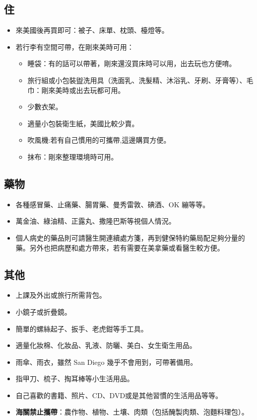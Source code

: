 \documentclass[10pt,a4paper]{book}
\begin{document}
\begin{CJK}{UTF8}{bkai}
\subsection{住}
\begin{itemize}
\item 來美國後再買即可：被子、床單、枕頭、檯燈等。
\item 若行李有空間可帶，在剛來美時可用：
\begin{itemize}
\item 睡袋：有的話可以帶著，剛來還沒買床時可以用，出去玩也方便唷。
\item 旅行組或小包裝盥洗用具（洗面乳、洗髮精、沐浴乳、牙刷、牙膏等）、毛巾：剛來美時或出去玩都可用。
\item 少數衣架。
\item 適量小包裝衛生紙，美國比較少賣。
\item 吹風機:若有自己慣用的可攜帶,這邊購買方便。
\item 抹布：剛來整理環境時可用。
\end{itemize}
\end{itemize}
\subsection{藥物}
\begin{itemize}
\item 各種感冒藥、止痛藥、腸胃藥、曼秀雷敦、碘酒、OK 繃等等。
\item 萬金油、綠油精、正露丸、撒隆巴斯等視個人情況。
\item 個人病史的藥品則可請醫生開連續處方箋，再到健保特約藥局配足夠分量的藥。另外也把病歷和處方帶來，若有需要在美拿藥或看醫生較方便。
\end{itemize}

\subsection{其他}
\begin{itemize}
\item 上課及外出或旅行所需背包。
\item 小鏡子或折疊鏡。
\item 簡單的螺絲起子、扳手、老虎鉗等手工具。
\item 適量化妝棉、化妝品、乳液、防曬、美白、女生衛生用品。
\item 雨傘、雨衣，雖然 San Diego 幾乎不會用到，可帶著備用。
\item 指甲刀、梳子、掏耳棒等小生活用品。
\item 自己喜歡的書籍、照片、CD、DVD或是其他習慣的生活用品等等。
\item \textbf{海關禁止攜帶}：農作物、植物、土壤、肉類（包括醃製肉類、泡麵料理包）。
\end{itemize}
 

\end{CJK}
\end{document}
